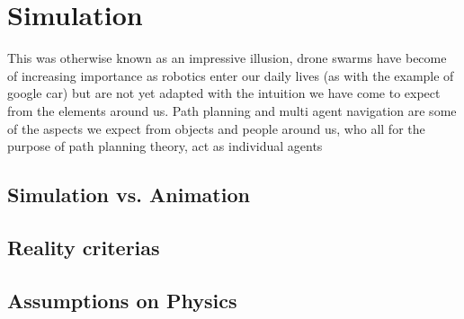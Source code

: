 
\chapter{Simulation}
This was otherwise known as an impressive illusion, drone swarms have become of increasing importance as robotics enter our daily lives (as with the example of google car) but are not yet adapted with the intuition we have come to expect from the elements around us. Path planning and multi agent navigation are some of the aspects we expect from objects and people around us, who all for the purpose of path planning theory, act as individual agents 

\section{Simulation vs. Animation}

\section{Reality criterias}

\section{Assumptions on Physics}